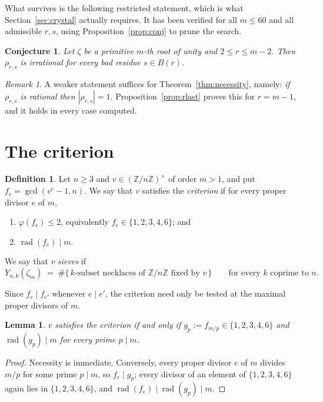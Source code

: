 \documentclass[11pt,a4paper]{article}
\theoremstyle{plain}
\newtheorem{lemma}[theorem]{Lemma}
\newtheorem{conjecture}[theorem]{Conjecture}
\theoremstyle{definition}
\newtheorem{definition}[theorem]{Definition}
\theoremstyle{remark}
\newtheorem{remark}[theorem]{Remark}
\newcommand{\Z}{\mathbb{Z}}
\newcommand{\Zn}{\Z/n\Z}
\newcommand{\units}[1]{(\Z/#1\Z)^{\times}}
\newcommand{\rad}{\operatorname{rad}}
\begin{document}
What survives is the following restricted statement, which is what
Section~\ref{sec:crystal} actually requires. It has been verified for all $m\le60$ and all
admissible $r,s$, using Proposition~\ref{prop:conj} to prune the search.

\begin{conjecture}\label{conj:irr}
Let $\zeta$ be a primitive $m$-th root of unity and $2\le r\le m-2$. Then $\rho_{r,s}$ is
irrational for every bad residue $s\in B(r)$.
\end{conjecture}

\begin{remark}\label{rem:modulusone}
A weaker statement suffices for Theorem~\ref{thm:necessity}, namely: \emph{if $\rho_{r,s}$
is rational then $|\rho_{r,s}|=1$}. Proposition~\ref{prop:rlast} proves this for $r=m-1$,
and it holds in every case computed.
\end{remark}

\section{The criterion}\label{sec:criterion}

\begin{definition}\label{def:criterion}
Let $n\ge3$ and $v\in\units{n}$ of order $m>1$, and put $f_e=\gcd(v^e-1,n)$. We say that $v$
satisfies the \emph{criterion} if for every proper divisor $e$ of $m$,
\begin{enumerate}
  \item[\textup{(i)}] $\varphi(f_e)\le 2$, equivalently $f_e\in\{1,2,3,4,6\}$; and
  \item[\textup{(ii)}] $\rad(f_e)\mid m$.
\end{enumerate}
We say that $v$ \emph{sieves} if
\[
  Y_{n,k}(\zeta_m)\;=\;\#\{\,k\text{-subset necklaces of }\Zn\text{ fixed by }v\,\}
  \qquad\text{for every }k\text{ coprime to }n .
\]
\end{definition}

Since $f_e\mid f_{e'}$ whenever $e\mid e'$, the criterion need only be tested at the maximal
proper divisors of $m$.

\begin{lemma}\label{lem:maximal}
$v$ satisfies the criterion if and only if $g_p:=f_{m/p}\in\{1,2,3,4,6\}$ and
$\rad(g_p)\mid m$ for every prime $p\mid m$.
\end{lemma}

\begin{proof}
Necessity is immediate. Conversely, every proper divisor $e$ of $m$ divides $m/p$ for some
prime $p\mid m$, so $f_e\mid g_p$; every divisor of an element of $\{1,2,3,4,6\}$ again lies
in $\{1,2,3,4,6\}$, and $\rad(f_e)\mid\rad(g_p)\mid m$.
\end{proof}
\end{document}
